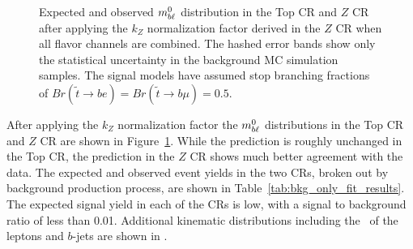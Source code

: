 \begin{figure}[ht]
  \centering
  \caption[
    Expected and observed $\MBL^0$ distribution in the Top CR and
    $Z$ CR after applying the $k_Z$ normalization factor derived in the $Z$ CR
    when all flavor channels are combined.
  ]{
    Expected and observed $\MBL^0$ distribution in the Top CR and
    $Z$ CR after applying the $k_Z$ normalization factor derived in the $Z$ CR
    when all flavor channels are combined.
    The hashed error bands show only the statistical uncertainty in the
    background MC simulation samples.
    The signal models have assumed stop branching fractions of
    $Br(\tilde{t}\rightarrow be) = Br(\tilde{t}\rightarrow b\mu) = 0.5$.
  }
  \label{fig:cr_mbl_0__w_norm_factor}
\end{figure}

After applying the $k_Z$ normalization factor the $\MBL^0$ distributions in
the Top CR and $Z$ CR are shown in Figure~\ref{fig:cr_mbl_0__w_norm_factor}.
While the prediction is roughly unchanged in the Top CR, the prediction in the
$Z$ CR shows much better agreement with the data.
The expected and observed event yields in the two CRs, broken out by background
production process, are shown in Table~\ref{tab:bkg_only_fit_results}.
The expected signal yield in each of the CRs is low, with a signal to
background ratio of less than 0.01.
Additional kinematic distributions including the \pt\ of the leptons and
$b$-jets are shown in
.

